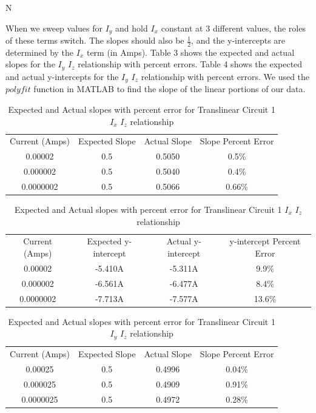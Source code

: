 N\documentclass{article}
\begin{document}
When we sweep values for $I_y$ and hold $I_x$ constant at 3 different values, the roles of these terms switch. The slopes should also be $\frac{1}{2}$, and the y-intercepts are determined by the $I_x$ term (in Amps).
Table 3 shows the expected and actual slopes for the $I_y$ $I_z$ relationship with percent errors.
Table 4 shows the expected and actual y-intercepts for the $I_y$ $I_z$ relationship with percent errors.
We used the $polyfit$ function in MATLAB to find the slope of the linear portions of our data. 

\begin{table}[h]
    \centering
    \begin{tabular}{|c|c|c|c|}
        \hline
        Current (Amps) & Expected Slope & Actual Slope & Slope Percent Error \\
        
         0.00002 & 0.5 & 0.5050 & 0.5\% \\ \hline
         0.000002 & 0.5 & 0.5040 & 0.4\% \\ \hline 
         0.0000002 & 0.5 & 0.5066 & 0.66\% \\ \hline 
    \end{tabular}
    \caption{Expected and Actual slopes with percent error for Translinear Circuit 1 $I_x$ $I_z$ relationship}
    \label{tab:my_label}
\end{table}

\begin{table}[h]
    \centering
    \begin{tabular}{|c|c|c|c|}
        \hline
        Current (Amps) & Expected y-intercept & Actual y-intercept & y-intercept Percent Error \\
        
         0.00002 & -5.410A & -5.311A & 9.9\% \\ \hline
         0.000002 & -6.561A & -6.477A & 8.4\% \\ \hline 
         0.0000002 & -7.713A & -7.577A & 13.6\% \\ \hline 
    \end{tabular}
    \caption{Expected and Actual slopes with percent error for Translinear Circuit 1 $I_x$ $I_z$ relationship}
    \label{tab:my_label}
\end{table}

\begin{table}[h]
    \centering
    \begin{tabular}{|c|c|c|c|}
        \hline
        Current (Amps) & Expected Slope & Actual Slope & Slope Percent Error \\
        
         0.00025 & 0.5 & 0.4996 & 0.04\% \\ \hline
         0.000025 & 0.5 & 0.4909 & 0.91\% \\ \hline 
         0.0000025 & 0.5 & 0.4972 & 0.28\% \\ \hline 
    \end{tabular}
    \caption{Expected and Actual slopes with percent error for Translinear Circuit 1 $I_y$ $I_z$ relationship}
    \label{tab:my_label}
\end{table}
\end{document}
